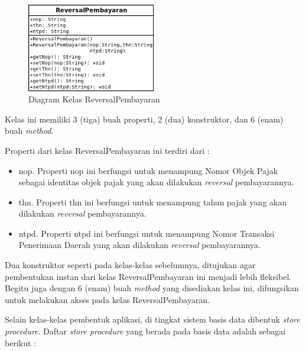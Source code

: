 \begin{figure}[H]
  \centering
  \includegraphics[width=0.5\textwidth]{./resources/uml/uml-class-ReversalPembayaran}
  \caption{Diagram Kelas ReversalPembayaran}
  \label{fig:uml-class-ReversalPembayaran}
\end{figure}

Kelas ini memiliki 3 (tiga) buah properti, 2 (dua) konstruktor, dan 6 (enam) buah \textit{method}.

Properti dari kelas ReversalPembayaran ini terdiri dari :

\begin{itemize}
  \item nop. Properti nop ini berfungsi untuk menampung Nomor Objek Pajak sebagai identitas objek pajak yang akan dilakukan \textit{reversal} pembayarannya.
  \item thn. Properti thn ini berfungsi untuk menampung tahun pajak yang akan dilakukan \textit{reversal} pembayarannya.
  \item ntpd. Properti ntpd ini berfungsi untuk menampung Nomor Transaksi Penerimaan Daerah yang akan dilakukan \textit{reversal} pembayarannya.
\end{itemize}

Dua konstruktor seperti pada kelas-kelas sebelumnya, ditujukan agar pembentukan instan dari kelas ReversalPembayaran ini menjadi lebih fleksibel. Begitu juga dengan 6 (enam) buah \textit{method} yang disediakan kelas ini, difungsikan untuk melakukan akses pada kelas ReversalPembayaran.

Selain kelas-kelas pembentuk aplikasi, di tingkat sistem basis data dibentuk \textit{store procedure}. Daftar \textit{store procedure} yang berada pada basis data adalah sebagai berikut :

